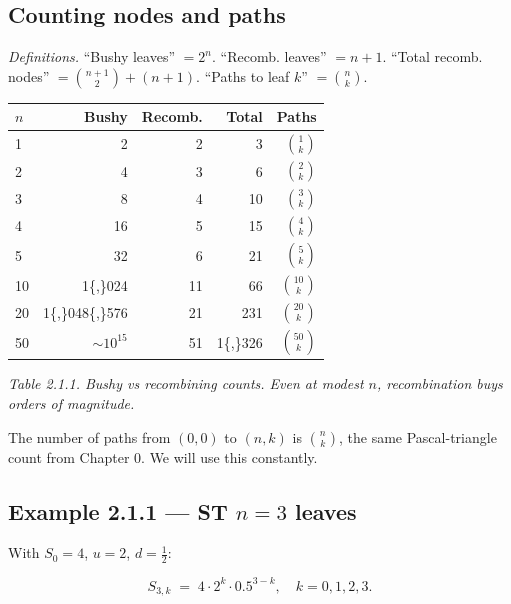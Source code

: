 \documentclass[
  10pt,
  twoside]{book}
\newcounter{none} %
\begin{document}
\subsection{Counting nodes and paths}\label{counting-nodes-and-paths}

\emph{Definitions.} ``Bushy leaves'' \(=2^n\). ``Recomb. leaves''
\(=n+1\). ``Total recomb. nodes'' \(=\binom{n+1}{2}+(n+1)\). ``Paths to
leaf \(k\)'' \(=\binom{n}{k}\).

{\def\LTcaptype{none} %
\begin{table}[H]
\centering
\begin{tabular}{|l|r|r|r|r|}
\toprule
\(n\) & Bushy & Recomb. & Total & Paths \\
\midrule



1 & 2 & 2 & 3 & \(\binom{1}{k}\) \\
2 & 4 & 3 & 6 & \(\binom{2}{k}\) \\
3 & 8 & 4 & 10 & \(\binom{3}{k}\) \\
4 & 16 & 5 & 15 & \(\binom{4}{k}\) \\
5 & 32 & 6 & 21 & \(\binom{5}{k}\) \\
10 & 1\{,\}024 & 11 & 66 & \(\binom{10}{k}\) \\
20 & 1\{,\}048\{,\}576 & 21 & 231 & \(\binom{20}{k}\) \\
50 & \(\sim 10^{15}\) & 51 & 1\{,\}326 & \(\binom{50}{k}\) \\
\bottomrule
\end{tabular}
\end{table}
}

\emph{Table 2.1.1. Bushy vs recombining counts. Even at modest \(n\),
recombination buys orders of magnitude.}

The number of paths from \((0,0)\) to \((n,k)\) is \(\binom{n}{k}\), the
same Pascal-triangle count from Chapter 0. We will use this constantly.

\subsection{\texorpdfstring{Example 2.1.1 --- ST \(n=3\)
leaves}{Example 2.1.1 --- ST n=3 leaves}}\label{example-2.1.1-st-n3-leaves}

With \(S_0=4\), \(u=2\), \(d=\tfrac12\):

\[
S_{3,k} \;=\; 4 \cdot 2^k \cdot 0.5^{3-k}, \quad k=0,1,2,3.
\]
\end{document}
